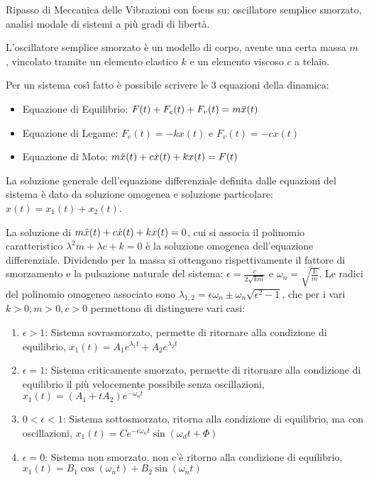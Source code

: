 Ripasso di Meccanica delle Vibrazioni con focus su: oscillatore semplice smorzato, analisi modale di sistemi a più gradi di libertà.

L'oscillatore semplice smorzato è un modello di corpo, avente una certa massa \(m\) , vincolato tramite un elemento elastico \(k\) e un elemento viscoso \(c\) a telaio.

Per un sistema così fatto è possibile scrivere le 3 equazioni della dinamica:
\begin{itemize}
    \item Equazione di Equilibrio: \(F(t) + F_e(t) + F_v(t) = m \Ddot{x}(t) \)
    \item Equazione di Legame: \(F_e(t) = -k x(t)\) e \( F_v(t) = -c\dot{x}(t) \)
    \item Equazione di Moto: \(m\Ddot{x}(t) + c\dot{x}(t) + k x(t) = F(t)\)
\end{itemize}

La soluzione generale dell'equazione differenziale definita dalle equazioni del sistema è dato da soluzione omogenea e soluzione particolare: \(x(t) = x_1(t) + x_2(t)\).

La soluzione di \(m\Ddot{x}(t)+c\dot{x}(t)+kx(t)=0\), cui si associa il polinomio caratteristico \( \lambda^2 m +\lambda c +k = 0 \) è la soluzione omogenea dell'equazione differenziale. 
Dividendo per la massa si ottengono rispettivamente il fattore di smorzamento e la pulsazione naturale del sistema: \( \epsilon = \frac{c}{2\sqrt{km}} \) e \(\omega_n = \sqrt{\frac{k}{m}}\).
Le radici del polinomio omogeneo associato sono \(\lambda_{1,2} = \epsilon \omega_n \pm \omega_n \sqrt{\epsilon^2 - 1}\), che per i vari \(k>0,m>0,c>0\) permettono di distinguere vari casi:
\begin{enumerate}
    \item \(\epsilon > 1\): Sistema sovrasmorzato, permette di ritornare alla condizione di equilibrio, \(x_1(t) = A_1 e^{\lambda_1t} + A_2 e^{\lambda_2t}\)
    \item \( \epsilon = 1 \): Sistema criticamente smorzato, permette di   ritornare alla condizione di equilibrio il più velocemente possibile senza oscillazioni, \(x_1(t) = (A_1+t A_2) e^{-\omega_n t} \)
    \item \( 0 < \epsilon < 1 \): Sistema sottosmorzato, ritorna alla condizione di equilibrio, ma con oscillazioni, \(x_1(t) = C e^{-\epsilon \omega_n t} \sin{\left(\omega_d t + \Phi \right)}\)
    \item \(\epsilon = 0\): Sistema non smorzato, non c'è ritorno alla condizione di equilibrio, \( x_1(t) = B_1 \cos{\left( \omega_n t \right)} + B_2 \sin{\left( \omega_n t \right)} \)
\end{enumerate}

